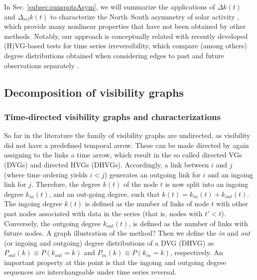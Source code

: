In  Sec. \ref{subsec:sunspotsAsym}, we will summarize the applications of $\Delta k(t)$ and $\Delta_{rel} k(t)$ to characterize the North--South asymmetry of solar activity \cite{Zou2014}, which provide many nonlinear properties that have not been obtained by other methods. Notably, our approach is conceptually related with recently developed (H)VG-based tests for time series irreversibility, which compare (among others) degree distributions obtained when considering edges to past and future observations separately \citep{Donges2013}.


	\subsection{Decomposition of visibility graphs} \label{sec:timeIRvg}
		\subsubsection{Time-directed visibility graphs and characterizations}
		So far in the literature the family of visibility graphs are undirected, as visibility did not have a predefined temporal arrow. These can be made directed by again assigning to the links a time arrow, which result in the so called directed VGs (DVGs) and directed HVGs (DHVGs). Accordingly, a link between $i$ and $j$ (where time ordering yields $i< j$) generates an outgoing link for $i$ and an ingoing link for $j$. Therefore, the degree $k(t)$ of the node $t$ is now split into an ingoing degree $k_{in}(t)$, and an out-going degree, such that $k(t)= k_{in}(t)+k_{out}(t)$. The ingoing degree $k(t)$ is defined as the number of links of node $t$ with other past nodes associated with data in the series (that is, nodes with $ t' < t$). Conversely, the outgoing degree $k_{out}(t)$, is defined as the number of links with future nodes. {\color{red}A graph illustration of the method?} Then we define the \textit{in} and \textit{out} (or ingoing and outgoing) degree distributions of a DVG (DHVG) as $P_{out}(k) \equiv P(k_{out} = k)$ and $P_{in}(k) \equiv P(k_{in} = k)$, respectively. An important property at this point is that the ingoing and outgoing degree sequences are interchangeable under time series reversal. 
		
